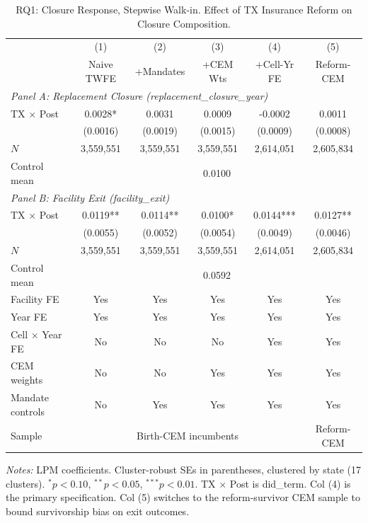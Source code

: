 \begin{table}[htbp]
\centering
\caption{RQ1: Closure Response, Stepwise Walk-in. Effect of TX Insurance Reform on Closure Composition.}
\label{tab:rq1_stepwise}
\begin{tabular}{lccccc}
\toprule
 & (1) & (2) & (3) & (4) & (5) \\
 & Naive TWFE & +Mandates & +CEM Wts & +Cell-Yr FE & Reform-CEM \\
\midrule
\multicolumn{6}{l}{\textit{Panel A: Replacement Closure (replacement\_closure\_year)}} \\[0.3em]
TX $\times$ Post & 0.0028* & 0.0031 & 0.0009 & -0.0002 & 0.0011 \\
& (0.0016) & (0.0019) & (0.0015) & (0.0009) & (0.0008) \\
$N$ & 3,559,551 & 3,559,551 & 3,559,551 & 2,614,051 & 2,605,834 \\
Control mean & \multicolumn{5}{c}{0.0100} \\
\midrule
\multicolumn{6}{l}{\textit{Panel B: Facility Exit (facility\_exit)}} \\[0.3em]
TX $\times$ Post & 0.0119** & 0.0114** & 0.0100* & 0.0144*** & 0.0127** \\
& (0.0055) & (0.0052) & (0.0054) & (0.0049) & (0.0046) \\
$N$ & 3,559,551 & 3,559,551 & 3,559,551 & 2,614,051 & 2,605,834 \\
Control mean & \multicolumn{5}{c}{0.0592} \\
\midrule
Facility FE         & Yes & Yes & Yes & Yes & Yes \\
Year FE             & Yes & Yes & Yes & Yes & Yes \\
Cell $\times$ Year FE & No & No & No & Yes & Yes \\
CEM weights         & No & No & Yes & Yes & Yes \\
Mandate controls    & No & Yes & Yes & Yes & Yes \\
Sample              & \multicolumn{4}{c}{Birth-CEM incumbents} & Reform-CEM \\
\bottomrule
\end{tabular}
\begin{minipage}{\linewidth}
\small
\textit{Notes:} LPM coefficients. Cluster-robust SEs in parentheses, clustered by state (17 clusters). $^{*}p<0.10$, $^{**}p<0.05$, $^{***}p<0.01$. TX $\times$ Post is did\_term. Col (4) is the primary specification. Col (5) switches to the reform-survivor CEM sample to bound survivorship bias on exit outcomes.
\end{minipage}
\end{table}
